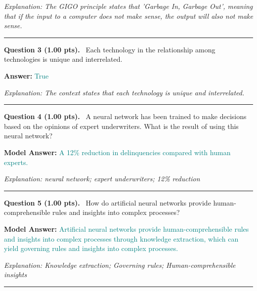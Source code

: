 \documentclass[12pt,a4paper]{article}
\begin{document}
\textit{\small Explanation: The GIGO principle states that 'Garbage In, Garbage Out', meaning that if the input to a computer does not make sense, the output will also not make sense.}



\vspace{0.8em}
\noindent\rule{\linewidth}{0.2pt}
\vspace{0.3em}


\noindent
\textbf{Question 3 (1.00 pts).}~
Each technology in the relationship among technologies is unique and interrelated.


\textbf{Answer:} \textcolor{teal}{True}



\textit{\small Explanation: The context states that each technology is unique and interrelated.}



\vspace{0.8em}
\noindent\rule{\linewidth}{0.2pt}
\vspace{0.3em}


\noindent
\textbf{Question 4 (1.00 pts).}~
A neural network has been trained to make decisions based on the opinions of expert underwriters. What is the result of using this neural network?


\textbf{Model Answer:} \textcolor{teal}{A 12\% reduction in delinquencies compared with human experts.}



\textit{\small Explanation: neural network; expert underwriters; 12\% reduction}



\vspace{0.8em}
\noindent\rule{\linewidth}{0.2pt}
\vspace{0.3em}


\noindent
\textbf{Question 5 (1.00 pts).}~
How do artificial neural networks provide human-comprehensible rules and insights into complex processes?


\textbf{Model Answer:} \textcolor{teal}{Artificial neural networks provide human-comprehensible rules and insights into complex processes through knowledge extraction, which can yield governing rules and insights into complex processes.}



\textit{\small Explanation: Knowledge extraction; Governing rules; Human-comprehensible insights}



\vspace{0.8em}
\noindent\rule{\linewidth}{0.2pt}
\vspace{0.3em}
\end{document}
